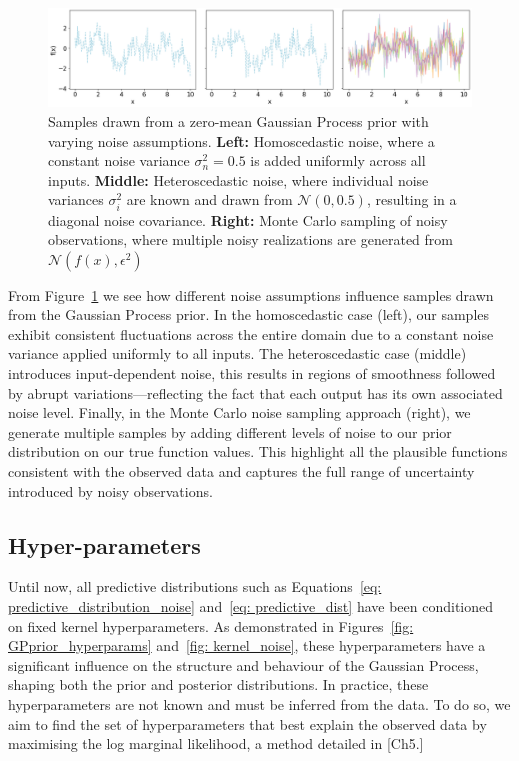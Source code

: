 \documentclass[11pt]{article}
\begin{document}
\begin{figure}[H]
    \centering
    \includegraphics[width=\textwidth]{LatexPlots/1dplots/GPR_noise_comparison.png}
    \caption{Samples drawn from a zero-mean Gaussian Process prior with varying noise assumptions.
    \textbf{Left:} Homoscedastic noise, where a constant noise variance \(\sigma_n^2 = 0.5\) is added uniformly across all inputs.
    \textbf{Middle:} Heteroscedastic noise, where individual noise variances \(\sigma_i^2\) are known and drawn from \(\mathcal{N}(0, 0.5)\), resulting in a diagonal noise covariance.
    \textbf{Right:} Monte Carlo sampling of noisy observations, where multiple noisy realizations are generated from \(\mathcal{N}(f(x), \epsilon^2)\)}
    \label{fig:noise_comparison}
\end{figure}

\noindent
From Figure~\ref{fig:noise_comparison} we see how different noise assumptions influence samples drawn from the Gaussian Process prior. 
In the homoscedastic case (left), our samples exhibit consistent fluctuations across the entire domain due to a constant noise variance applied uniformly to all inputs. 
The heteroscedastic case (middle) introduces input-dependent noise, this results in regions of smoothness followed by abrupt variations—reflecting the fact that each output has its own associated noise level.
Finally, in the Monte Carlo noise sampling approach (right), we generate multiple samples by adding different levels of noise to our prior distribution on our true function values.
This highlight all the plausible functions consistent with the observed data and captures the full range of uncertainty introduced by noisy observations.
 



\subsection{Hyper-parameters}
\label{sec: Hyper_parameters}
Until now, all predictive distributions such as Equations~\ref{eq: predictive_distribution_noise} and~\ref{eq: predictive_dist} have been conditioned on fixed kernel hyperparameters. As demonstrated in Figures~\ref{fig: GPprior_hyperparams} and~\ref{fig: kernel_noise}, these hyperparameters have a significant influence on the structure and behaviour of the Gaussian Process, shaping both the prior and posterior distributions. 
In practice, these hyperparameters are not known and must be inferred from the data. To do so, we aim to find the set of hyperparameters that best explain the observed data by maximising the log marginal likelihood, a method detailed in [Ch5\cite{bible}.]
\end{document}
